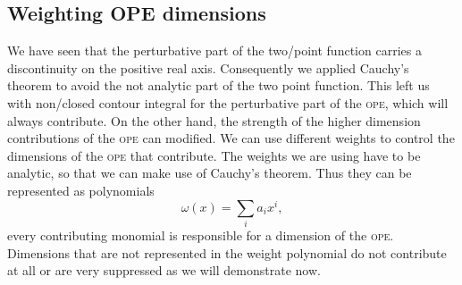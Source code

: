 \documentclass[../../index.tex]{subfiles}
\begin{document}
\subsection{Weighting OPE dimensions}
We have seen that the perturbative part of the two\-/point function carries a
discontinuity on the positive real axis. Consequently we applied Cauchy's
theorem to avoid the not analytic part of the two point function. This left us
with non\-/closed contour integral for the perturbative part of the
\textsc{ope}, which will always contribute. On the other hand, the strength of
the higher dimension contributions of the \textsc{ope} can modified. We can use
different weights to control the dimensions of the \textsc{ope} that contribute.
The weights we are using have to be analytic, so that we can make use of
Cauchy's theorem. Thus they can be represented as polynomials
\begin{equation}
  \omega(x) = \sum_i a_i x^i,
\end{equation}
every contributing monomial is responsible for a dimension of the \textsc{ope}.
Dimensions that are not represented in the weight polynomial do not contribute
at all or are very suppressed as we will demonstrate now.
\end{document}
